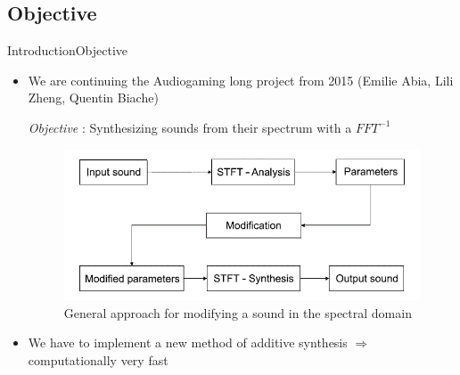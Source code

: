 \documentclass[10pt]{beamer}
\begin{document}
\subsection{Objective}
\begin{frame}{Introduction}{Objective}


  \begin{itemize}
          \item<1-> We are continuing the Audiogaming long project from 2015 (Emilie Abia, Lili Zheng, Quentin Biache)
\begin{block}{}
{\it Objective} : Synthesizing sounds from their spectrum with a $ FFT^{-1} $
	\begin{figure}
	\includegraphics[scale=0.4]{Analysis_Synthesis.png}
	\caption{General approach for modifying a sound in the spectral domain}
	\end{figure}
\end{block}   
	\item<1-> We have to implement a new method of additive synthesis $\Rightarrow$ computationally very fast
  \end{itemize}
\end{frame}

\end{document}
